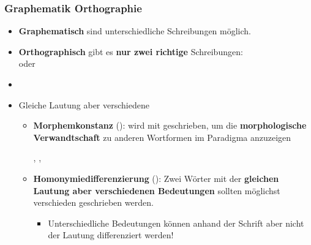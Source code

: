 \begin{frame}
\frametitle{Graphematik \vs Orthographie}

\begin{itemize}
	\item \textbf{Graphematisch} sind unterschiedliche Schreibungen möglich.

\pause 
	
	\item \textbf{Orthographisch} gibt es \textbf{nur zwei richtige} Schreibungen: \\
	 oder 
	\item[]
	\item Gleiche Lautung aber verschiedene 
	
	\begin{itemize}
		\item \textbf{Morphemkonstanz} (\su):  wird mit  geschrieben, um die \textbf{morphologische Verwandtschaft} zu anderen Wortformen im Paradigma anzuzeigen 
		
		\ea {}, , 
		\z 

		\item \textbf{Homonymiedifferenzierung} (\su): Zwei Wörter mit der \textbf{gleichen Lautung aber verschiedenen Bedeutungen} sollten möglichst verschieden geschrieben werden.
		
		\begin{itemize}
			\item Unterschiedliche Bedeutungen können anhand der Schrift aber nicht der Lautung differenziert werden!
		\end{itemize}
	\end{itemize}
\end{itemize}

\end{frame}


